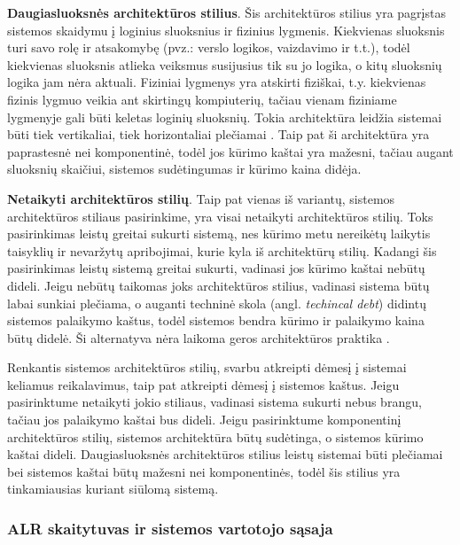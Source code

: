 \textbf{Daugiasluoksnės architektūros stilius}. Šis architektūros stilius yra pagrįstas sistemos skaidymu į loginius sluoksnius ir fizinius lygmenis. Kiekvienas sluoksnis turi savo rolę ir atsakomybę (pvz.: verslo logikos, vaizdavimo ir t.t.), todėl kiekvienas sluoksnis atlieka veiksmus susijusius tik su jo logika, o kitų sluoksnių logika jam nėra aktuali. Fiziniai lygmenys yra atskirti fiziškai, t.y. kiekvienas fizinis lygmuo veikia ant skirtingų kompiuterių, tačiau vienam fiziniame lygmenyje gali būti keletas loginių sluoksnių. Tokia architektūra leidžia sistemai būti tiek vertikaliai, tiek horizontaliai plečiamai \cite{By}. Taip pat ši architektūra yra paprastesnė nei komponentinė, todėl jos kūrimo kaštai yra mažesni, tačiau augant sluoksnių skaičiui, sistemos sudėtingumas ir kūrimo kaina didėja.

\textbf{Netaikyti architektūros stilių}. Taip pat vienas iš variantų, sistemos architektūros stiliaus pasirinkime, yra visai netaikyti architektūros stilių. Toks pasirinkimas leistų  greitai sukurti sistemą, nes kūrimo metu nereikėtų laikytis taisyklių ir nevaržytų apribojimai, kurie kyla iš architektūrų stilių. Kadangi šis pasirinkimas leistų sistemą greitai sukurti, vadinasi jos kūrimo kaštai nebūtų dideli. Jeigu nebūtų taikomas joks architektūros stilius, vadinasi sistema būtų labai sunkiai plečiama, o auganti techninė skola (angl. \textit{techincal debt}) didintų sistemos palaikymo kaštus, todėl sistemos bendra kūrimo ir palaikymo kaina būtų didelė. Ši alternatyva nėra laikoma geros architektūros praktika \cite{Bass2013}.

Renkantis sistemos architektūros stilių, svarbu atkreipti dėmesį į sistemai keliamus reikalavimus, taip pat atkreipti dėmesį į sistemos kaštus. Jeigu pasirinktume netaikyti jokio stiliaus, vadinasi sistema sukurti nebus brangu, tačiau jos palaikymo kaštai bus dideli. Jeigu pasirinktume komponentinį architektūros stilių, sistemos architektūra būtų sudėtinga, o sistemos kūrimo kaštai dideli. Daugiasluoksnės architektūros stilius leistų sistemai būti plečiamai bei sistemos kaštai būtų mažesni nei komponentinės, todėl šis stilius yra tinkamiausias kuriant siūlomą sistemą.


\subsubsection{ALR skaitytuvas ir sistemos vartotojo sąsaja}

